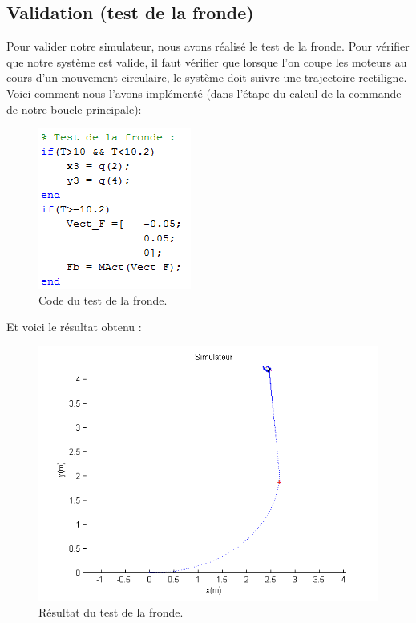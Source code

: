 \documentclass[a4paper,10pt]{article}
\begin{document}
\subsection{Validation (test de la fronde)}

Pour valider notre simulateur, nous avons réalisé le test de la fronde. Pour vérifier que notre système est valide, il faut vérifier que lorsque l’on coupe les moteurs au cours d’un mouvement circulaire, le système doit suivre une trajectoire rectiligne. Voici comment nous l’avons implémenté (dans l'étape du calcul de la commande de notre boucle principale):

\begin{figure}[H]
\bigcenter\includegraphics[scale=0.8]{images/fronde_code.png}
\caption{Code du test de la fronde.}
\end{figure}

Et voici le résultat obtenu :
\begin{figure}[H]
\bigcenter\includegraphics[scale=0.8]{images/fronde.png}
\caption{Résultat du test de la fronde.}
\end{figure}
\end{document}
